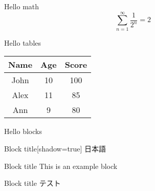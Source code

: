 \documentclass[lualatex]{beamer}
\begin{document}

    \begin{frame}{Hello math}
        $$ \sum_{n=1}^\infty \frac{1}{2^n} = 2 $$
    \end{frame}


    \begin{frame}{Hello tables}
        \centering
        \begin{tabular}{|c|c|c|}
            \hline
            Name & Age & Score \\
            \hline
            John & 10 & 100 \\
            Alex & 11 & 85 \\
            Ann  & 9  & 80 \\
            \hline
        \end{tabular}
    \end{frame}


    \begin{frame}{Hello blocks}
        \begin{block}{Block title}[shadow=true]
            日本語
        \end{block}

        \begin{exampleblock}{Block title}
            This is an example block
        \end{exampleblock}

        \begin{alertblock}{Block title}
            テスト
        \end{alertblock}
    \end{frame}
\end{document}
